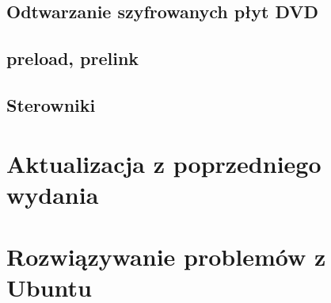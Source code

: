 \documentclass[a4paper,11pt,oneside]{mwart}
\begin{document}
        \subsection{Odtwarzanie szyfrowanych płyt DVD}
        		
        \subsection{preload, prelink}
        \subsection{Sterowniki} %
\section{Aktualizacja z poprzedniego wydania}
\section{Rozwiązywanie problemów z Ubuntu}
\end{document}

